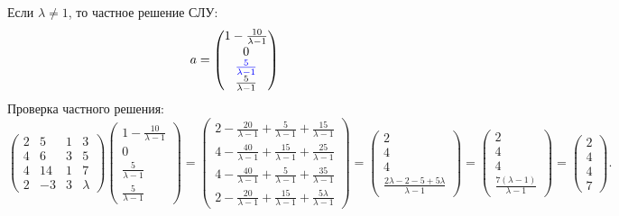 \documentclass[12pt]{article}
\begin{document}
    Если $\lambda \neq 1$, то частное решение СЛУ:
    \[
        a =
        \begin{pmatrix}
            1 - \frac{10}{\lambda - 1}              \\
            0                                       \\
            \textcolor{blue}{\frac{5}{\lambda - 1}} \\
            \frac{5}{\lambda - 1}
        \end{pmatrix}
    \]
        {\color{blue} Проверка частного решения:
    \[
        \begin{pmatrix}
            2 & 5  & 1 & 3       \\
            4 & 6  & 3 & 5       \\
            4 & 14 & 1 & 7       \\
            2 & -3 & 3 & \lambda
        \end{pmatrix}
        \begin{pmatrix}
            1 - \frac{10}{\lambda - 1} \\
            0                          \\
            \frac{5}{\lambda - 1}      \\
            \frac{5}{\lambda - 1}
        \end{pmatrix}
        =
        \begin{pmatrix}
            2 - \frac{20}{\lambda-1} + \frac{5}{\lambda-1} + \frac{15}{\lambda-1}  \\
            4 - \frac{40}{\lambda-1} + \frac{15}{\lambda-1} + \frac{25}{\lambda-1} \\
            4 - \frac{40}{\lambda-1} + \frac{5}{\lambda-1} + \frac{35}{\lambda-1}  \\
            2 - \frac{20}{\lambda-1} + \frac{15}{\lambda-1} + \frac{5 \lambda}{\lambda-1}
        \end{pmatrix}
        =
        \begin{pmatrix}
            2 \\
            4 \\
            4 \\
            \frac{2 \lambda - 2 - 5 + 5 \lambda}{\lambda-1}
        \end{pmatrix}
        =
        \begin{pmatrix}
            2 \\
            4 \\
            4 \\
            \frac{7 (\lambda - 1)}{\lambda-1}
        \end{pmatrix}
        =
        \begin{pmatrix}
            2 \\
            4 \\
            4 \\
            7
        \end{pmatrix}
        .
    \]
    }
\end{document}
